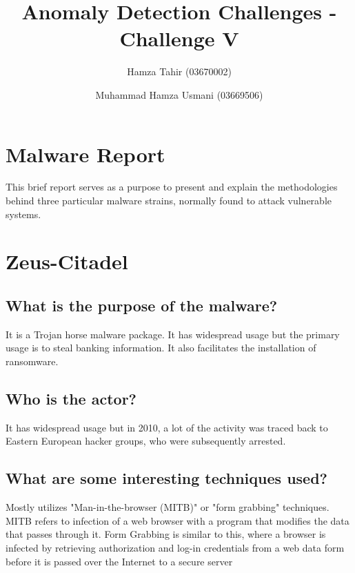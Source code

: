\documentclass{llncs}
\begin{document}
%
\frontmatter          %
%
\pagestyle{headings}  %

\mainmatter              %
%
\title{Anomaly Detection Challenges - Challenge V}
%

%
\author{Hamza Tahir (03670002) \and Muhammad Hamza Usmani (03669506)}
%
%

\maketitle              %



\section{Malware Report}

This brief report serves as a purpose to present and explain the methodologies behind three particular malware strains, normally found to attack vulnerable systems. 

\section{Zeus-Citadel}

\subsection{What is the purpose of the malware?}
It is a Trojan horse malware package. It has widespread usage but the primary usage is to steal banking information. It also facilitates the installation of ransomware. 
\subsection{Who is the actor?}
It has widespread usage but in 2010, a lot of the activity was traced back to Eastern European hacker groups, who were subsequently arrested.
\subsection{What are some interesting techniques used?}
Mostly utilizes "Man-in-the-browser (MITB)" or "form grabbing" techniques. MITB refers to infection of a web browser with a program that modifies the data that passes through it. Form Grabbing is similar to this, where a browser is infected by retrieving authorization and log-in credentials from a web data form before it is passed over the Internet to a secure server 
\end{document}
